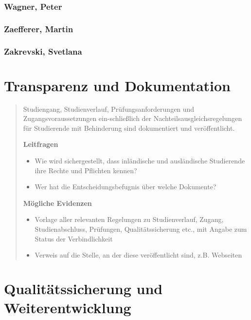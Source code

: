 \subsection{Wagner, Peter}\label{wagner-peter}

\subsection{Zaefferer, Martin}\label{zaefferer-martin}

\subsection{Zakrevski, Svetlana}\label{zakrevski-svetlana}

\chapter{Transparenz und
Dokumentation}\label{transparenz-und-dokumentation}

\begin{quote}
Studiengang, Studienverlauf, Prüfungsanforderungen und
Zugangsvoraussetzungen ein-schließlich der Nachteilsausgleichsregelungen
für Studierende mit Behinderung sind dokumentiert und veröffentlicht.

\textbf{Leitfragen}

\begin{itemize}
\item
  Wie wird sichergestellt, dass inländische und ausländische Studierende
  ihre Rechte und Pflichten kennen?
\item
  Wer hat die Entscheidungsbefugnis über welche Dokumente?
\end{itemize}

\textbf{Mögliche Evidenzen}

\begin{itemize}
\item
  Vorlage aller relevanten Regelungen zu Studienverlauf, Zugang,
  Studienabschluss, Prüfungen, Qualitätssicherung etc., mit Angabe zum
  Status der Verbindlichkeit
\item
  Verweis auf die Stelle, an der diese veröffentlicht sind, z.B.
  Webseiten
\end{itemize}
\end{quote}

\chapter{Qualitätssicherung und
Weiterentwicklung}\label{qualituxe4tssicherung-und-weiterentwicklung}

